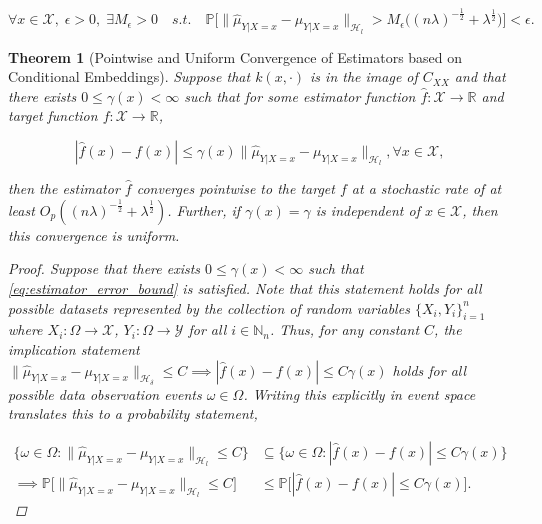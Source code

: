 \documentclass{article}
\newtheorem{theorem}{Theorem}[section]
\begin{document}
		\begin{equation}
			\forall x \in \mathcal{X}, \; \epsilon > 0, \; \exists M_{\epsilon} > 0 \quad s.t. \quad \mathbb{P}\Big[\big\| \hat{\mu}_{Y | X = x} - \mu_{Y | X = x} \big\|_{\mathcal{H}_{l}} > M_{\epsilon} \Big((n \lambda)^{-\frac{1}{2}} + \lambda^{\frac{1}{2}}\Big)\Big] < \epsilon.
		\label{eq:empirical_conditional_embedding_stochastic_convergence}
		\end{equation}
	
	\begin{theorem}[Pointwise and Uniform Convergence of Estimators based on Conditional Embeddings]
		\label{thm:pointwise_uniform_convergence}
		Suppose that $k(x, \cdot)$ is in the image of $C_{XX}$ and that there exists $0 \leq \gamma(x) < \infty$ such that for some estimator function $\hat{f} : \mathcal{X} \to \mathbb{R}$ and target function  $f : \mathcal{X} \to \mathbb{R}$,
		
		\begin{equation}
			| \hat{f}(x) - f(x) | \leq \gamma(x) \big\| \hat{\mu}_{Y | X = x} - \mu_{Y | X = x} \big\|_{\mathcal{H}_{l}}, \forall x \in \mathcal{X},
		\label{eq:estimator_error_bound}
		\end{equation}
		 
		then the estimator $\hat{f}$ converges pointwise to the target $f$ at a stochastic rate of at least $O_{p}((n \lambda)^{-\frac{1}{2}} + \lambda^{\frac{1}{2}})$. Further, if $\gamma(x) = \gamma$ is independent of $x \in \mathcal{X}$, then this convergence is uniform.
		
		\begin{proof}
			
			Suppose that there exists $0 \leq \gamma(x) < \infty$ such that \eqref{eq:estimator_error_bound} is satisfied. Note that this statement holds for all possible datasets represented by the collection of random variables $\{X_{i}, Y_{i}\}_{i = 1}^{n}$ where $X_{i} : \Omega \to \mathcal{X}$,  $Y_{i} : \Omega \to \mathcal{Y}$ for all $i \in \mathbb{N}_{n}$. Thus, for any constant $C$, the implication statement $\big\| \hat{\mu}_{Y | X = x} - \mu_{Y | X = x} \big\|_{\mathcal{H}_{\delta}} \leq C \implies | \hat{f}(x) - f(x) | \leq C \gamma(x)$ holds for all possible data observation events $\omega \in \Omega$. Writing this explicitly in event space translates this to a probability statement,
			
			\begin{equation}
			\begin{aligned}
				\{\omega \in \Omega : \big\| \hat{\mu}_{Y | X = x} - \mu_{Y | X = x} \big\|_{\mathcal{H}_{l}} \leq C\} &\subseteq \{\omega \in \Omega : | \hat{f}(x) - f(x) | \leq C \gamma(x)\} \\
				\implies \mathbb{P}\Big[\big\| \hat{\mu}_{Y | X = x} - \mu_{Y | X = x} \big\|_{\mathcal{H}_{l}} \leq C\Big] &\leq \mathbb{P}\Big[| \hat{f}(x) - f(x) | \leq C \gamma(x) \Big].
			\label{eq:probability_statement}
			\end{aligned}
			\end{equation}
			

\end{proof}
\end{theorem}
\end{document}
